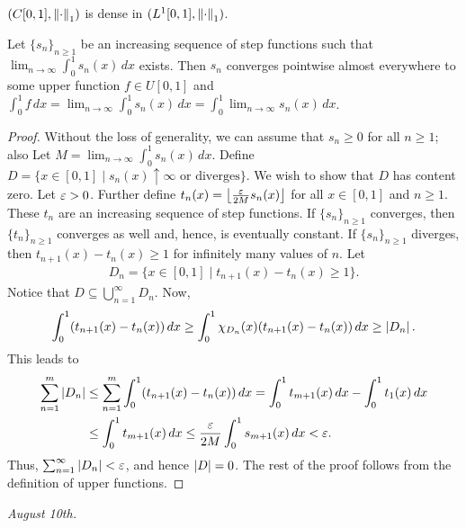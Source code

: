 \begin{lemma}
    $(C[0,1],\left\lVert\cdot\right\rVert_{1})$ is dense in $(L^{1}[0,1],\left\lVert\cdot\right\rVert_{1})$.
\end{lemma}

\begin{theorem}
    Let $\{s_{n}\}_{n \geq 1}$ be an increasing sequence of step functions such that $\lim_{n \to \infty} \int_{0}^{1} s_{n}(x) \, dx$ exists. Then $s_{n}$ converges pointwise almost everywhere to some upper function $f \in U[0,1]$ and $\int_{0}^{1} f \, dx = \lim_{n \to \infty} \int_{0}^{1} s_{n}(x) \, dx = \int_{0}^{1} \lim_{n \to \infty} s_{n}(x) \, dx$.
\end{theorem}
\begin{proof}
    Without the loss of generality, we can assume that $s_{n} \geq 0$ for all $n \geq 1$; also Let $M = \lim_{n \to \infty} \int_{0}^{1} s_{n}(x) \, dx$. Define $D = \{x \in [0,1] \mid s_{n}(x) \uparrow \infty \text{ or diverges}\}$. We wish to show that $D$ has content zero. Let $\varepsilon > 0$. Further define $t_{n}(x) = \left\lfloor \frac{\varepsilon}{2 M} s_{n}(x) \right\rfloor$ for all $x \in [0,1]$ and $n \geq 1$. These $t_{n}$ are an increasing sequence of step functions. If $\{s_{n}\}_{n \geq 1}$ converges, then $\{t_{n}\}_{n \geq 1}$ converges as well and, hence, is eventually constant. If $\{s_{n}\}_{n \geq 1}$ diverges, then $t_{n+1}(x) - t_{n}(x) \geq 1$ for infinitely many values of $n$. Let
    \begin{align}
        D_{n} = \{x \in [0,1] \mid t_{n+1}(x) - t_{n}(x) \geq 1\}.
    \end{align} 
    Notice that $D \subseteq \bigcup_{n=1}^{\infty} D_{n}$. Now,
    \begin{align}
        \int_{0}^{1} (t_{n+1}(x) - t_{n}(x)) \, dx \geq \int_{0}^{1} \chi_{D_{n}}(x)(t_{n+1}(x)-t_{n}(x)) \, dx \geq \left| D_{n} \right|.
    \end{align}
    This leads to
    \begin{align}
        \sum_{n=1}^{m} \left| D_{n} \right| &\leq \sum_{n=1}^{m} \int_{0}^{1} (t_{n+1}(x)-t_{n}(x)) \, dx = \int_{0}^{1} t_{m+1}(x) \, dx - \int_{0}^{1} t_{1}(x) \, dx \notag \\ &\leq \int_{0}^{1} t_{m+1}(x) \, dx \leq \frac{\varepsilon}{2 M} \int_{0}^{1} s_{m+1}(x) \, dx < \varepsilon.
    \end{align}
    Thus, $\sum_{n=1}^{\infty} \left| D_{n} \right| < \varepsilon$, and hence $\left| D \right| = 0$. The rest of the proof follows from the definition of upper functions.
\end{proof}

\noindent \textit{August 10th.}

